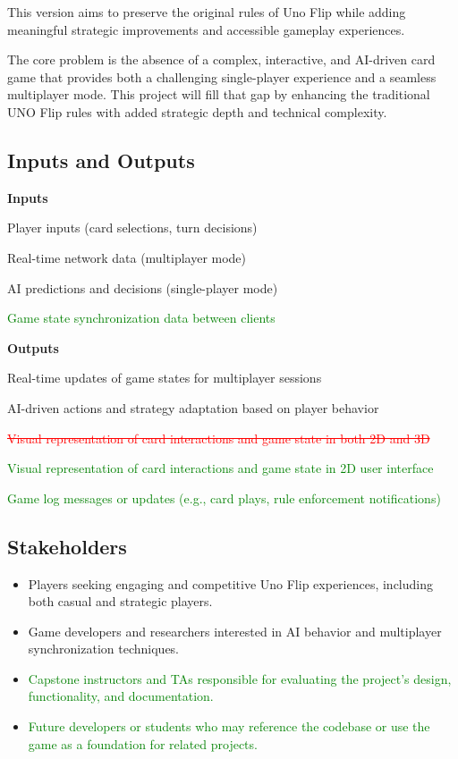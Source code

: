 \documentclass[12pt]{article}
\newcommand{\removed}[1]{\textcolor{red}{\sout{#1}}}
\newcommand{\added}[1]{\textcolor{green}{#1}}
\begin{document}
This version aims to preserve the original rules of Uno Flip while adding meaningful strategic improvements and accessible gameplay experiences.

The core problem is the absence of a complex, interactive, and AI-driven card game that provides both a challenging single-player experience and a seamless multiplayer mode. This project will fill that gap by enhancing the traditional UNO Flip rules with added strategic depth and technical complexity.

\subsection*{Inputs and Outputs}

\textbf{Inputs}
\begin{itemize}
    \item Player inputs (card selections, turn decisions)
    \item Real-time network data (multiplayer mode)
    \item AI predictions and decisions (single-player mode)
    \added{\item Game state synchronization data between clients}
\end{itemize}

\textbf{Outputs}
\begin{itemize}
    \item Real-time updates of game states for multiplayer sessions
    \item AI-driven actions and strategy adaptation based on player behavior
    \item \removed{Visual representation of card interactions and game state in both 2D and 3D}
    \added{\item Visual representation of card interactions and game state in 2D user interface}
    \added{\item Game log messages or updates (e.g., card plays, rule enforcement notifications)}
\end{itemize}

\subsection*{Stakeholders}
\begin{itemize}
    \item Players seeking engaging and competitive Uno Flip experiences, including both casual and strategic players.
    \item Game developers and researchers interested in AI behavior and multiplayer synchronization techniques.
    \item \added{Capstone instructors and TAs responsible for evaluating the project's design, functionality, and documentation.}
    \item \added{Future developers or students who may reference the codebase or use the game as a foundation for related projects.}
\end{itemize}
\end{document}
